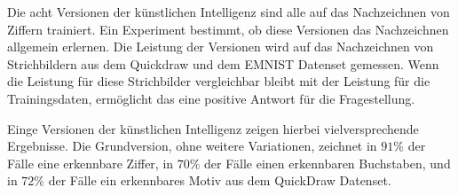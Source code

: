 Die acht Versionen der künstlichen Intelligenz sind alle auf das Nachzeichnen
von Ziffern trainiert. Ein Experiment bestimmt, ob diese Versionen das
Nachzeichnen allgemein erlernen. Die Leistung der Versionen wird auf das
Nachzeichnen von Strichbildern aus dem Quickdraw und dem EMNIST Datenset
gemessen. Wenn die Leistung für diese Strichbilder vergleichbar bleibt mit der
Leistung für die Trainingsdaten, ermöglicht das eine positive Antwort für
die Fragestellung.

Einge Versionen der künstlichen Intelligenz zeigen hierbei vielversprechende
Ergebnisse. Die Grundversion, ohne weitere Variationen, zeichnet in $91\%$ der
Fälle eine erkennbare Ziffer, in $70\%$ der Fälle einen erkennbaren Buchstaben,
und in $72\%$ der Fälle ein erkennbares Motiv aus dem QuickDraw Datenset. 


